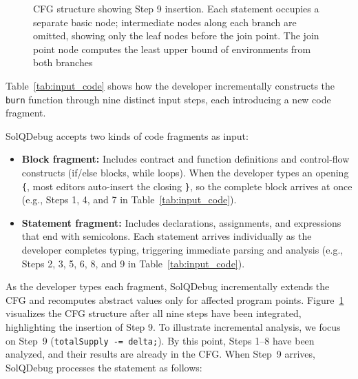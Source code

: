 \documentclass[pdflatex,sn-basic]{sn-jnl}%
\theoremstyle{thmstyleone}%
\theoremstyle{thmstyletwo}%
\theoremstyle{thmstylethree}%
\begin{document}
\begin{figure}[t!]
  \caption{CFG structure showing Step 9 insertion. Each statement occupies a separate basic node; intermediate nodes along each branch are omitted, showing only the leaf nodes before the join point. The join point node computes the least upper bound of environments from both branches}
  \label{fig:solqdebug-cfg}
\end{figure}

Table~\ref{tab:input_code} shows how the developer incrementally constructs the \texttt{burn}
function through nine distinct input steps, each introducing a new code fragment.

SolQDebug accepts two kinds of code fragments as input:

\begin{itemize}
  \item \textbf{Block fragment:} Includes contract and function definitions and control-flow constructs (if/else blocks, while loops).
        When the developer types an opening \texttt{\{}, most editors auto-insert the closing \texttt{\}},
        so the complete block arrives at once
        (e.g., Steps 1, 4, and 7 in Table~\ref{tab:input_code}).

  \item \textbf{Statement fragment:} Includes declarations, assignments, and expressions that
        end with semicolons. Each statement arrives individually as the developer completes typing,
        triggering immediate parsing and analysis
        (e.g., Steps 2, 3, 5, 6, 8, and 9 in Table~\ref{tab:input_code}).
\end{itemize}

As the developer types each fragment, SolQDebug incrementally extends the CFG
and recomputes abstract values only for affected program points.
Figure~\ref{fig:solqdebug-cfg} visualizes the CFG structure after all nine steps have been integrated, highlighting the insertion of Step 9.
To illustrate incremental analysis, we focus on Step~9 (\texttt{totalSupply -= delta;}).
By this point, Steps 1--8 have been analyzed, and their results are already in the CFG.
When Step~9 arrives, SolQDebug processes the statement as follows:
\end{document}
